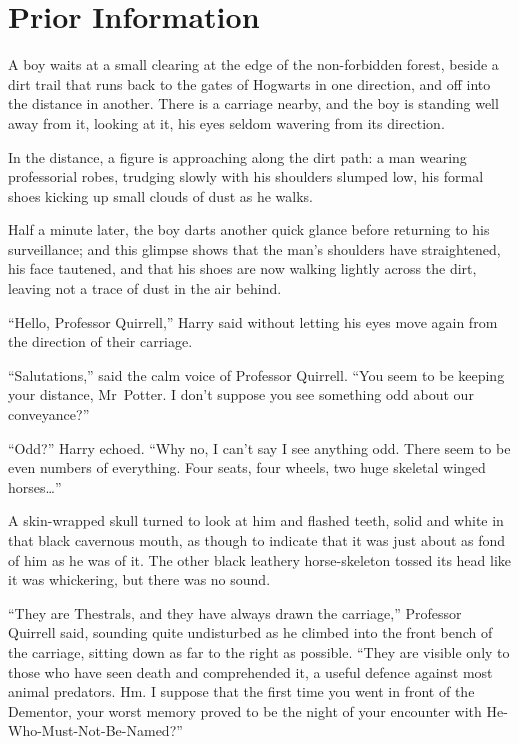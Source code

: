 \chapter{Prior Information}

\lettrine{A}{} boy waits at a small clearing at the edge of the non-forbidden forest, beside a dirt trail that runs back to the gates of Hogwarts in one direction, and off into the distance in another. There is a carriage nearby, and the boy is standing well away from it, looking at it, his eyes seldom wavering from its direction.

In the distance, a figure is approaching along the dirt path: a man wearing professorial robes, trudging slowly with his shoulders slumped low, his formal shoes kicking up small clouds of dust as he walks.

Half a minute later, the boy darts another quick glance before returning to his surveillance; and this glimpse shows that the man’s shoulders have straightened, his face tautened, and that his shoes are now walking lightly across the dirt, leaving not a trace of dust in the air behind.

“Hello, Professor Quirrell,” Harry said without letting his eyes move again from the direction of their carriage.

“Salutations,” said the calm voice of Professor Quirrell.
“You seem to be keeping your distance, Mr~Potter. I don’t suppose you see something odd about our conveyance?”

“Odd?” Harry echoed.
“Why no, I can’t say I see anything odd. There seem to be even numbers of everything. Four seats, four wheels, two huge skeletal winged horses…”

A skin-wrapped skull turned to look at him and flashed teeth, solid and white in that black cavernous mouth, as though to indicate that it was just about as fond of him as he was of it. The other black leathery horse-skeleton tossed its head like it was whickering, but there was no sound.

“They are Thestrals, and they have always drawn the carriage,” Professor Quirrell said, sounding quite undisturbed as he climbed into the front bench of the carriage, sitting down as far to the right as possible.
“They are visible only to those who have seen death and comprehended it, a useful defence against most animal predators. Hm. I suppose that the first time you went in front of the Dementor, your worst memory proved to be the night of your encounter with He-Who-Must-Not-Be-Named?”

